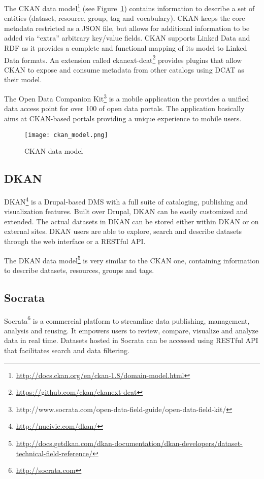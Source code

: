 The CKAN data model\footnote{\url{http://docs.ckan.org/en/ckan-1.8/domain-model.html}} (see Figure~\ref{fig:ckan_model}) contains information to describe a set of entities (dataset, resource, group, tag and vocabulary). CKAN keeps the core metadata restricted as a JSON file, but allows for additional information to be added via ``extra'' arbitrary key/value fields. CKAN supports Linked Data and RDF as it provides a complete and functional mapping of its model to Linked Data formats. An extension called ckanext-dcat\footnote{\url{https://github.com/ckan/ckanext-dcat}} provides plugins that allow CKAN to expose and consume metadata from other catalogs using DCAT as their model.

The Open Data Companion Kit\footnote{http://www.socrata.com/open-data-field-guide/open-data-field-kit/} is a mobile application the provides a unified data access point for over 100 of open data portals. The application basically aims at CKAN-based portals providing a unique experience to mobile users.

\begin{figure}[ht!]
\centering
	\texttt{[image: ckan\_model.png]}
	\caption{CKAN data model}
	\label{fig:ckan_model}
\end{figure}

\subsection{DKAN}
DKAN\footnote{\url{http://nucivic.com/dkan/}} is a Drupal-based DMS with a full suite of cataloging, publishing and visualization features. Built over Drupal, DKAN can be easily customized and extended. The actual datasets in DKAN can be stored either within DKAN or on external sites. DKAN users are able to explore, search and describe datasets through the web interface or a RESTful API.

The DKAN data model\footnote{\url{http://docs.getdkan.com/dkan-documentation/dkan-developers/dataset-technical-field-reference/}} is very similar to the CKAN one, containing information to describe datasets, resources, groups and tags.

\subsection{Socrata}
Socrata\footnote{\url{http://socrata.com}} is a commercial platform to streamline data publishing, management, analysis and reusing. It empowers users to review, compare, visualize and analyze data in real time. Datasets hosted in Socrata can be accessed using RESTful API that facilitates search and data filtering.

